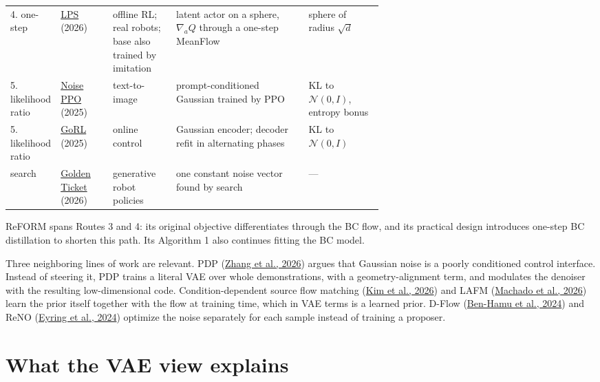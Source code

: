 \begin{table}[htbp]
\begin{tabularx}{\linewidth}{@{}>{\raggedright}p{0.12\linewidth}>{\raggedright}p{0.14\linewidth}>{\raggedright}p{0.17\linewidth}>{\raggedright}X>{\raggedright\arraybackslash}p{0.2\linewidth}@{}}
4. one-step & \hyperlink{ref:5}{LPS} (2026) & offline RL; real robots; base also trained by imitation & latent actor on a sphere, $\nabla_a Q$ through a one-step MeanFlow & sphere of radius $\sqrt{d}$ \\
5. likelihood ratio & \hyperlink{ref:12}{Noise PPO} (2025) & text-to-image & prompt-conditioned Gaussian trained by PPO & KL to $\mathcal{N}(0, I)$, entropy bonus \\
5. likelihood ratio & \hyperlink{ref:20}{GoRL} (2025) & online control & Gaussian encoder; decoder refit in alternating phases & KL to $\mathcal{N}(0, I)$ \\
search & \hyperlink{ref:15}{Golden Ticket} (2026) & generative robot policies & one constant noise vector found by search & --- \\
\bottomrule
\end{tabularx}
\end{table}

ReFORM spans Routes 3 and 4: its original objective differentiates through the BC flow, and its practical design introduces one-step BC distillation to shorten this path. Its Algorithm 1 also continues fitting the BC model.

Three neighboring lines of work are relevant. PDP (\hyperlink{ref:22}{Zhang et al., 2026}) argues that Gaussian noise is a poorly conditioned control interface. Instead of steering it, PDP trains a literal VAE over whole demonstrations, with a geometry-alignment term, and modulates the denoiser with the resulting low-dimensional code. Condition-dependent source flow matching (\hyperlink{ref:6}{Kim et al., 2026}) and LAFM (\hyperlink{ref:11}{Machado et al., 2026}) learn the prior itself together with the flow at training time, which in VAE terms is a learned prior. D-Flow (\hyperlink{ref:1}{Ben-Hamu et al., 2024}) and ReNO (\hyperlink{ref:3}{Eyring et al., 2024}) optimize the noise separately for each sample instead of training a proposer.

\section{What the VAE view explains}
\label{sec:6}
